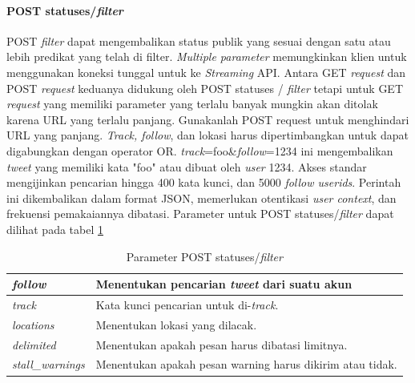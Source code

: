\paragraph{POST statuses/\textit{filter}}
POST \textit{filter} dapat mengembalikan status publik yang sesuai dengan satu atau lebih predikat yang telah di filter. \textit{Multiple parameter} memungkinkan klien untuk menggunakan koneksi tunggal untuk ke \textit{Streaming} API. Antara GET \textit{request} dan POST \textit{request} keduanya didukung oleh POST statuses / \textit{filter} tetapi untuk GET \textit{request} yang memiliki parameter yang terlalu banyak mungkin akan ditolak karena URL yang terlalu panjang. Gunakanlah POST request untuk menghindari URL yang panjang.
\textit{Track, follow}, dan lokasi harus dipertimbangkan untuk dapat digabungkan dengan operator OR. \textit{track}=foo\&\textit{follow}=1234 ini mengembalikan \textit{tweet} yang memiliki kata "foo" atau dibuat oleh \textit{user} 1234.
Akses standar mengijinkan pencarian hingga 400 kata kunci, dan 5000 \textit{follow userids}. Perintah ini dikembalikan dalam format JSON, memerlukan otentikasi \textit{user context}, dan frekuensi pemakaiannya dibatasi. Parameter untuk POST statuses/\textit{filter} dapat dilihat pada tabel \ref{table:ParameterPostStatusesFilter}



\begin{table}[h]
\begin{tabular}{|p{3cm}|p{11cm}|}
\hline
\textit{follow}          & Menentukan pencarian \textit{tweet} dari suatu akun \\ \hline
\textit{track}           & Kata kunci pencarian untuk di-\textit{track}.              \\ \hline
\textit{locations}       & Menentukan lokasi yang dilacak.                                                    \\ \hline
\textit{delimited}       & Menentukan apakah pesan harus dibatasi limitnya.                                         \\ \hline
\textit{stall\_warnings} & Menentukan apakah pesan warning harus dikirim atau tidak. \\ \hline                                        
\end{tabular}
\caption{Parameter POST statuses/\textit{filter}}
\label{table:ParameterPostStatusesFilter}
\end{table}


